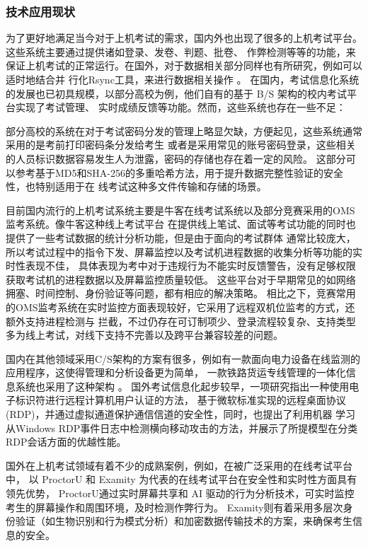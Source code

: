 \subsubsection{技术应用现状}

为了更好地满足当今对于上机考试的需求，国内外也出现了很多的上机考试平台。这些系统主要通过提供诸如登录、发卷、判题、批卷、
作弊检测等等的功能，来保证上机考试的正常运行。在国外，对于数据相关部分同样也有所研究，例如可以适时地结合并
行化Rsync工具，来进行数据相关操作\cite{Zhang_2020} \cite{osti_1772472}。
在国内，考试信息化系统的发展也已初具规模，以部分高校为例，他们自有的基于 B/S 架构的校内考试平台实现了考试管理、
实时成绩反馈等功能。然而，这些系统也存在一些不足：

部分高校的系统在对于考试密码分发的管理上略显欠缺，方便起见，这些系统通常采用的是考前打印密码条分发给考生
或者是采用常见的账号密码登录，这些相关的人员标识数据容易发生人为泄露，密码的存储也存在着一定的风险。
这部分可以参考基于MD5和SHA-256的多重哈希方法，用于提升数据完整性验证的安全性，也特别适用于在
线考试这种多文件传输和存储的场景\cite{10.1007/978-981-33-6977-1_47}。

目前国内流行的上机考试系统主要是牛客在线考试系统以及部分竞赛采用的OMS监考系统。像牛客这种线上考试平台
在提供线上笔试、面试等考试功能的同时也提供了一些考试数据的统计分析功能，但是由于面向的考试群体
通常比较庞大，所以考试过程中的指令下发、屏幕监控以及考试机进程数据的收集分析等功能的实时性表现不佳，
具体表现为考中对于违规行为不能实时反馈警告，没有足够权限获取考试机的进程数据以及屏幕监控质量较低。
这些平台对于早期常见的如网络拥塞、时间控制、身份验证等问题，都有相应的解决策略\cite{Tang2005}。
相比之下，竞赛常用的OMS监考系统在实时监控方面表现较好，它采用了远程双机位监考的方式，还额外支持进程检测与
拦截，不过仍存在可订制项少、登录流程较复杂、支持类型多为线上考试，对线下支持不完善以及跨平台兼容较差的问题。

国内在其他领域采用C/S架构的方案有很多，例如有一款面向电力设备在线监测的应用程序，这使得管理和分析设备更为简单，
一款铁路货运专线管理的一体化信息系统也采用了这种架构\cite{Zou2023} \cite{Gao2022}。
国外考试信息化起步较早，一项研究指出一种使用电子标识符进行远程计算机用户认证的方法，
基于微软标准实现的远程桌面协议(RDP)，并通过虚拟通道保护通信信道的安全性\cite{9396471}，同时，也提出了利用机器
学习从Windows RDP事件日志中检测横向移动攻击的方法，并展示了所提模型在分类RDP会话方面的优越性能\cite{BAI20219}。

国外在上机考试领域有着不少的成熟案例，例如，在被广泛采用的在线考试平台中，
以 ProctorU 和 Examity 为代表的在线考试平台在安全性和实时性方面具有领先优势，
ProctorU通过实时屏幕共享和 AI 驱动的行为分析技术，可实时监控考生的屏幕操作和周围环境，及时检测作弊行为。
Examity则有着采用多层次身份验证（如生物识别和行为模式分析）和加密数据传输技术的方案，来确保考生信息的安全。

